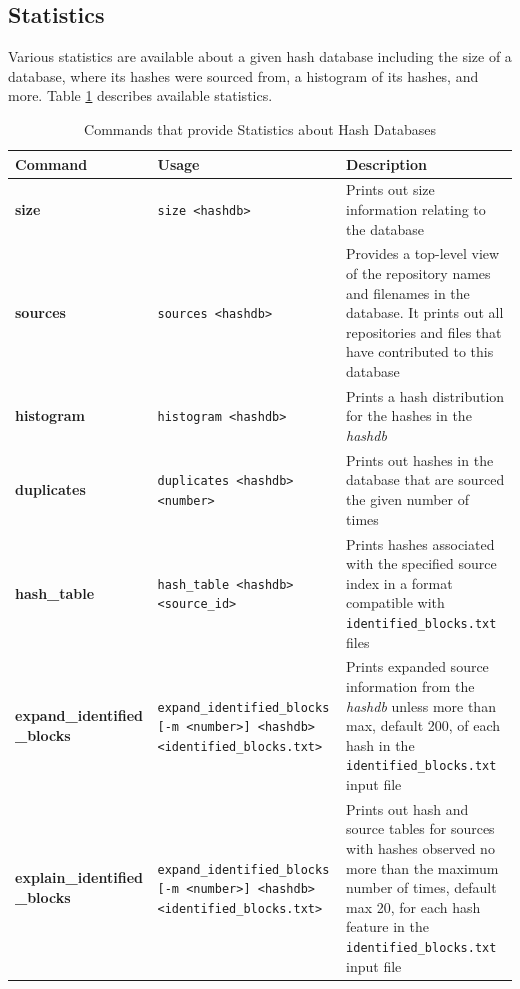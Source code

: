 \documentclass[11pt,fleqn]{article} %
\begin{document}
\subsection{Statistics}
Various statistics are available about a given hash database including the size of a database, where its hashes were sourced from, a histogram of its hashes, and more.
Table \ref{tab:statistics} describes available statistics.\\

\begin{table}[!ht]
\centering
\caption{Commands that provide Statistics about Hash Databases}
\label{tab:statistics}
\begin{tabular}{|p{3.5 cm}|p{6 cm}|p{4 cm}|}
\hline \hline
\textbf{Command} & \textbf{Usage} & \textbf{Description} \\
\hline
\textbf{size} & \verb+size <hashdb>+ & Prints out size information relating to the database\\
\hline
\textbf{sources} & \verb+sources <hashdb>+ & Provides a top-level view of the repository names and filenames in the database. It prints out all repositories and files that have contributed to this database\\
\hline
\textbf{histogram} & \verb+histogram <hashdb>+ &  Prints a hash distribution for the hashes in the \textit{hashdb}\\
\hline
\textbf{duplicates} & \verb+duplicates <hashdb> <number>+ &  Prints out hashes in the database that are sourced the given number of times\\
\hline
\textbf{hash\_table} & \verb+hash_table <hashdb> <source_id>+ &  Prints hashes associated with the specified source index in a format compatible with \texttt{identified\_blocks.txt} files\\
\hline
\textbf{expand\_identified} \textbf{\_blocks} & \verb+expand_identified_blocks+ \verb+[-m <number>] <hashdb>+ \verb+<identified_blocks.txt>+ & Prints expanded source information from the \textit{hashdb} unless more than max, default 200, of each hash in the \texttt{identified\_blocks.txt} input file\\
\hline
\textbf{explain\_identified} \textbf{\_blocks} & \verb+expand_identified_blocks+ \verb+[-m <number>] <hashdb>+ \verb+<identified_blocks.txt>+ & Prints out hash and source tables for sources with hashes observed no more than the maximum number of times, default max 20, for each hash feature in the \texttt{identified\_blocks.txt} input file\\
\hline
\end{tabular}
\end{table}
\end{document}
